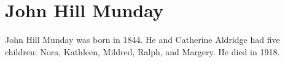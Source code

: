 \section{John Hill Munday}\label{John_Hill_Munday}

John Hill Munday was born in 1844. He and Catherine Aldridge had five children: Nora, Kathleen, Mildred, Ralph, and Margery. He died in 1918.

